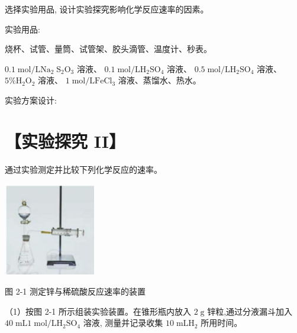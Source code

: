 \documentclass[10pt]{article}
\begin{document}
选择实验用品, 设计实验探究影响化学反应速率的因素。

实验用品:

烧杯、试管、量筒、试管架、胶头滴管、温度计、秒表。

\({0.1}\mathrm{\;{mol}}/\mathrm{L}{\mathrm{{Na}}}_{2}{\mathrm{\;S}}_{2}{\mathrm{O}}_{3}\) 溶液、 \({0.1}\mathrm{\;{mol}}/\mathrm{L}{\mathrm{H}}_{2}{\mathrm{{SO}}}_{4}\) 溶液、 \({0.5}\mathrm{\;{mol}}/\mathrm{L}{\mathrm{H}}_{2}{\mathrm{{SO}}}_{4}\) 溶液、 \(5\% {\mathrm{H}}_{2}{\mathrm{O}}_{2}\) 溶液、 \(1\mathrm{\;{mol}}/\mathrm{L}{\mathrm{{FeCl}}}_{3}\) 溶液、蒸馏水、热水。

实验方案设计:

\begin{center}
\end{center}

\section*{【实验探究 II】}

通过实验测定并比较下列化学反应的速率。

\begin{center}
\includegraphics[max width=0.3\textwidth]{images/0190da9d-8bfd-732f-bc2c-0b21d0f13b91_31_662089.jpg}
\end{center}

图 2-1 测定锌与稀硫酸反应速率的装置

（1）按图 2-1 所示组装实验装置。在锥形瓶内放入 \(2\mathrm{\;g}\) 锌粒,通过分液漏斗加入 \({40}\mathrm{\;{mL}}1\mathrm{\;{mol}}/\mathrm{L}{\mathrm{H}}_{2}{\mathrm{{SO}}}_{4}\) 溶液, 测量并记录收集 \({10}\mathrm{\;{mL}}{\mathrm{H}}_{2}\) 所用时间。
\end{document}
